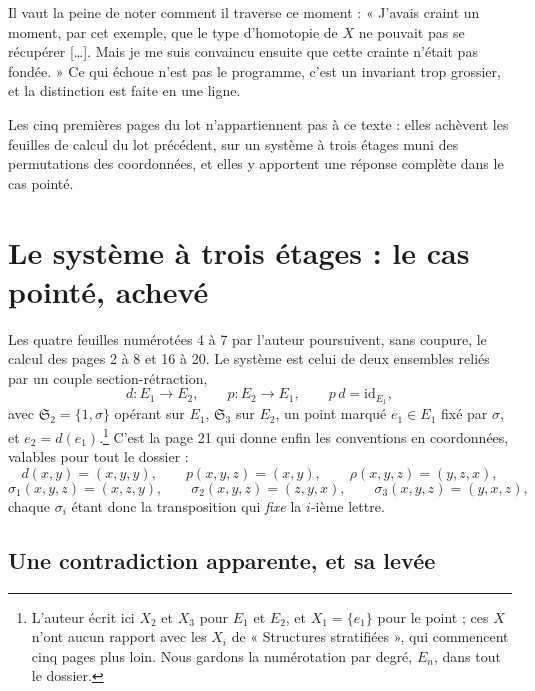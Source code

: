 \documentclass[11pt,a4paper]{article}
\begin{document}
\begin{resume}
Il vaut la peine de noter comment il traverse ce moment : « J'avais craint un
moment, par cet exemple, que le type d'homotopie de $X$ ne pouvait pas se
récupérer […]. Mais je me suis convaincu ensuite que cette crainte n'était pas
fondée. » Ce qui échoue n'est pas le programme, c'est un invariant trop grossier,
et la distinction est faite en une ligne.

Les cinq premières pages du lot n'appartiennent pas à ce texte : elles achèvent
les feuilles de calcul du lot précédent, sur un système à trois étages muni des
permutations des coordonnées, et elles y apportent une réponse complète dans le
cas pointé.

\end{resume}

\section*{Le système à trois étages : le cas pointé, achevé}

Les quatre feuilles numérotées 4 à 7 par l'auteur poursuivent, sans coupure, le
calcul des pages 2 à 8 et 16 à 20. Le système est celui de deux ensembles reliés
par un couple section-rétraction,
\[
  d \colon E_{1} \longrightarrow E_{2}, \qquad
  p \colon E_{2} \longrightarrow E_{1}, \qquad p\,d = \mathrm{id}_{E_{1}},
\]
avec $\mathfrak{S}_{2} = \{1,\sigma\}$ opérant sur $E_{1}$, $\mathfrak{S}_{3}$
sur $E_{2}$, un point marqué $e_{1} \in E_{1}$ fixé par $\sigma$, et
$e_{2} = d(e_{1})$.\footnote{L'auteur écrit ici $X_{2}$ et $X_{3}$ pour $E_{1}$
et $E_{2}$, et $X_{1} = \{e_{1}\}$ pour le point ; ces $X$ n'ont aucun rapport
avec les $X_{i}$ de « Structures stratifiées », qui commencent cinq pages plus
loin. Nous gardons la numérotation par degré, $E_{n}$, dans tout le dossier.}
C'est la page 21 qui donne enfin les conventions en coordonnées, valables pour
tout le dossier :
\[
  d(x,y) = (x,y,y), \qquad p(x,y,z) = (x,y), \qquad
  \rho(x,y,z) = (y,z,x),
\]
\[
  \sigma_{1}(x,y,z) = (x,z,y), \qquad \sigma_{2}(x,y,z) = (z,y,x), \qquad
  \sigma_{3}(x,y,z) = (y,x,z),
\]
chaque $\sigma_{i}$ étant donc la transposition qui \emph{fixe} la $i$-ième
lettre.

\subsection*{Une contradiction apparente, et sa levée}
\end{document}
